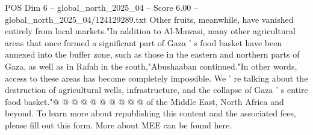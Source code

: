 \begin{textsample}{POS Dim 6 – global\_north\_2025\_04 – Score 6.00 – global\_north\_2025\_04/124129289.txt}
Other fruits, meanwhile, have vanished entirely from local markets."In addition to Al-Mawasi, many other agricultural areas that once formed a significant part of Gaza ' s food basket have been annexed into the buffer zone, such as those in the eastern and northern parts of Gaza, as well as in Rafah in the south,"Abushaaban continued."In other words, access to these areas has become completely impossible.
We ' re talking about the destruction of agricultural wells, infrastructure, and the collapse of Gaza ' s entire food basket."@ @ @ @ @ @ @ @ @ @ of the Middle East, North Africa and beyond.
To learn more about republishing this content and the associated fees, please fill out this form.
More about MEE can be found here.

\end{textsample}
